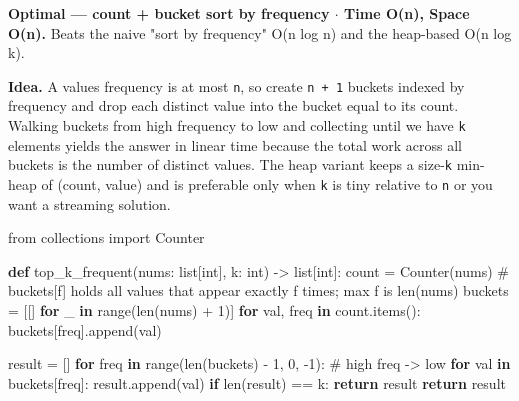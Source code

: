 \documentclass[11pt]{article}
\newenvironment{Shaded}{\begin{snugshade}}{\end{snugshade}}
\newcommand{\BuiltInTok}[1]{\textcolor[rgb]{0.50,0.55,0.55}{#1}}
\newcommand{\CommentTok}[1]{\textcolor[rgb]{0.48,0.49,0.49}{#1}}
\newcommand{\ControlFlowTok}[1]{\textcolor[rgb]{0.99,0.74,0.29}{\textbf{#1}}}
\newcommand{\DecValTok}[1]{\textcolor[rgb]{0.96,0.45,0.00}{#1}}
\newcommand{\ImportTok}[1]{\textcolor[rgb]{0.15,0.68,0.38}{#1}}
\newcommand{\KeywordTok}[1]{\textcolor[rgb]{0.81,0.81,0.76}{\textbf{#1}}}
\newcommand{\NormalTok}[1]{\textcolor[rgb]{0.81,0.81,0.76}{#1}}
\newcommand{\OperatorTok}[1]{\textcolor[rgb]{0.81,0.81,0.76}{#1}}
\begin{document}
\textbf{Optimal --- count + bucket sort by frequency \(\cdot\) Time O(n), Space O(n).} Beats the naive "sort by frequency" O(n log n) and the heap-based O(n log k).

\textbf{Idea.} A value\textquotesingle s frequency is at most \texttt{n}, so create \texttt{n\ +\ 1} buckets indexed by frequency and drop each distinct value into the bucket equal to its count. Walking buckets from high frequency to low and collecting until we have \texttt{k} elements yields the answer in linear time because the total work across all buckets is the number of distinct values. The heap variant keeps a size-\texttt{k} min-heap of (count, value) and is preferable only when \texttt{k} is tiny relative to \texttt{n} or you want a streaming solution.


\begin{Shaded}
\begin{Highlighting}[]
\ImportTok{from}\NormalTok{ collections }\ImportTok{import}\NormalTok{ Counter}

\KeywordTok{def}\NormalTok{ top\_k\_frequent(nums: }\BuiltInTok{list}\NormalTok{[}\BuiltInTok{int}\NormalTok{], k: }\BuiltInTok{int}\NormalTok{) }\OperatorTok{{-}\textgreater{}} \BuiltInTok{list}\NormalTok{[}\BuiltInTok{int}\NormalTok{]:}
\NormalTok{    count }\OperatorTok{=}\NormalTok{ Counter(nums)}
    \CommentTok{\# buckets[f] holds all values that appear exactly f times; max f is len(nums)}
\NormalTok{    buckets }\OperatorTok{=}\NormalTok{ [[] }\ControlFlowTok{for}\NormalTok{ \_ }\KeywordTok{in} \BuiltInTok{range}\NormalTok{(}\BuiltInTok{len}\NormalTok{(nums) }\OperatorTok{+} \DecValTok{1}\NormalTok{)]}
    \ControlFlowTok{for}\NormalTok{ val, freq }\KeywordTok{in}\NormalTok{ count.items():}
\NormalTok{        buckets[freq].append(val)}

\NormalTok{    result }\OperatorTok{=}\NormalTok{ []}
    \ControlFlowTok{for}\NormalTok{ freq }\KeywordTok{in} \BuiltInTok{range}\NormalTok{(}\BuiltInTok{len}\NormalTok{(buckets) }\OperatorTok{{-}} \DecValTok{1}\NormalTok{, }\DecValTok{0}\NormalTok{, }\OperatorTok{{-}}\DecValTok{1}\NormalTok{):   }\CommentTok{\# high freq {-}\textgreater{} low}
        \ControlFlowTok{for}\NormalTok{ val }\KeywordTok{in}\NormalTok{ buckets[freq]:}
\NormalTok{            result.append(val)}
            \ControlFlowTok{if} \BuiltInTok{len}\NormalTok{(result) }\OperatorTok{==}\NormalTok{ k:}
                \ControlFlowTok{return}\NormalTok{ result}
    \ControlFlowTok{return}\NormalTok{ result}
\end{Highlighting}
\end{Shaded}
\end{document}
